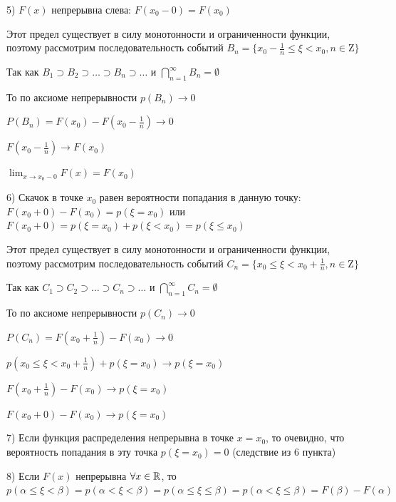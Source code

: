\documentclass[12pt]{article}
\begin{document}
    5) $F(x)$ непрерывна слева: $F(x_0 - 0) = F(x_0)$

    \begin{MyProof}
        Этот предел существует в силу монотонности и ограниченности функции, поэтому рассмотрим последовательность событий $B_n = \{x_0 - \frac{1}{n} \leq \xi < x_0, n \in \mathrm{Z}\}$

        Так как $B_1 \supset B_2 \supset \dots \supset B_n \supset \dots$ и $\bigcap_{n = 1}^\infty B_n = \emptyset$

        То по аксиоме непрерывности $p(B_n) \to 0$

        $P(B_n) = F(x_0) - F(x_0 - \frac{1}{n}) \rightarrow 0$

        $F(x_0 - \frac{1}{n}) \to F(x_0)$

        $\lim_{x \to x_0 - 0} F(x) = F(x_0)$
    \end{MyProof}
    
    6) Скачок в точке $x_0$ равен вероятности попадания в данную точку: $F(x_0 + 0) - F(x_0) = p(\xi = x_0)$ или $F(x_0 + 0) = p(\xi = x_0) + p(\xi < x_0) = p(\xi \leq x_0)$

    
    \begin{MyProof}
        Этот предел существует в силу монотонности и ограниченности функции, поэтому рассмотрим последовательность событий $C_n = \{x_0 \leq \xi < x_0 + \frac{1}{n}, n \in \mathrm{Z}\}$

        Так как $C_1 \supset C_2 \supset \dots \supset C_n \supset \dots$ и $\bigcap_{n = 1}^\infty C_n = \emptyset$

        То по аксиоме непрерывности $p(C_n) \to 0$

        $P(C_n) = F(x_0 + \frac{1}{n}) - F(x_0) \rightarrow 0$

        $p(x_0 \leq \xi < x_0 + \frac{1}{n}) + p(\xi = x_0) \rightarrow p(\xi = x_0)$

        $F(x_0 + \frac{1}{n}) - F(x_0) \to p(\xi = x_0)$

        $F(x_0 + 0) - F(x_0) \to p(\xi = x_0)$
    \end{MyProof}
    
    7) Если функция распределения непрерывна в точке $x = x_0$, то очевидно, что вероятность попадания в эту точка $p(\xi = x_0) = 0$ (следствие из 6 пункта)
    
    8) Если $F(x)$ непрерывна $\forall x \in \mathbb{R}$, то $p(\alpha \leq \xi < \beta) = p(\alpha < \xi < \beta) = p(\alpha \leq \xi \leq \beta) = p(\alpha < \xi \leq \beta) = F(\beta) - F(\alpha)$
    
\end{document}
